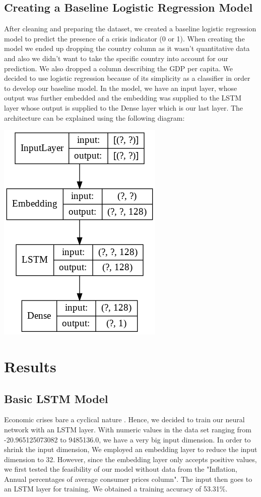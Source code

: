 \documentclass[12pt]{article}
\begin{document}
\subsection{Creating a Baseline Logistic Regression Model}
After cleaning and preparing the dataset, we created a baseline logistic regression model to predict the presence of a crisis indicator (0 or 1). When creating the model we ended up dropping the country column as it wasn’t quantitative data and also we didn’t want to take the specific country into account for our prediction. We also dropped a column describing the GDP per capita. We decided to use logistic regression because of its simplicity as a classifier in order to develop our baseline model. In the model, we have an input layer, whose output was further embedded and the embedding was supplied to the LSTM layer whose output is supplied to the Dense layer which is our last layer. The architecture can be explained using the following diagram:\\
\begin{center}
\includegraphics[scale=0.5]{model_3(1).png}\\
\end{center}



\section{Results}
\subsection{Basic LSTM Model}
Economic crises bare a cyclical nature \cite{10.1007/978-3-030-15577-3_11}. Hence, we decided to train our neural network with an LSTM layer. With numeric values in the data set ranging from -20.965125073082 to 9485136.0, we have a very big input dimension. In order to shrink the input dimension, We employed an embedding layer to reduce the input dimension to 32. However, since the embedding layer only accepts positive values, we first tested the feasibility of our model without data from the "Inflation, Annual percentages of average consumer prices column". The input then goes to an LSTM layer for training. We obtained a training accuracy of 53.31\%.
\end{document}
